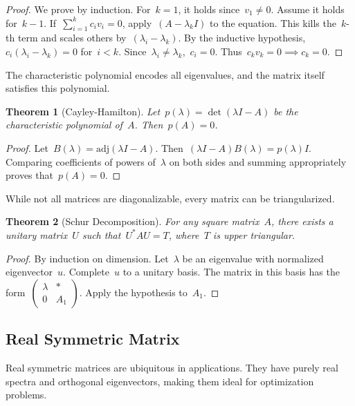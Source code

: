 \documentclass[12pt]{article}
\newtheorem{theorem}{Theorem}[section]
\begin{document}
\begin{proof}
    We prove by induction. For~$k=1$, it holds since~$v_1 \neq 0$. Assume it holds for~$k-1$. If~$\sum_{i=1}^k c_i v_i = 0$, apply~$(A - \lambda_k I)$ to the equation. This kills the~$k$-th term and scales others by~$(\lambda_i - \lambda_k)$. By the inductive hypothesis,~$c_i(\lambda_i - \lambda_k) = 0$ for~$i < k$. Since~$\lambda_i \neq \lambda_k$,~$c_i = 0$. Thus~$c_k v_k = 0 \implies c_k = 0$.
\end{proof}

The characteristic polynomial encodes all eigenvalues, and the matrix itself satisfies this polynomial.

\begin{theorem}[Cayley-Hamilton]
    Let~$p(\lambda) = \det(\lambda I - A)$ be the characteristic polynomial of~$A$. Then~$p(A) = 0$.
\end{theorem}

\begin{proof}
    Let~$B(\lambda) = \text{adj}(\lambda I - A)$. Then~$(\lambda I - A)B(\lambda) = p(\lambda)I$. Comparing coefficients of powers of~$\lambda$ on both sides and summing appropriately proves that~$p(A) = 0$.
\end{proof}

While not all matrices are diagonalizable, every matrix can be triangularized.

\begin{theorem}[Schur Decomposition]
    For any square matrix~$A$, there exists a unitary matrix~$U$ such that~$U^* A U = T$, where~$T$ is upper triangular.
\end{theorem}

\begin{proof}
    By induction on dimension. Let~$\lambda$ be an eigenvalue with normalized eigenvector~$u$. Complete~$u$ to a unitary basis. The matrix in this basis has the form~$\begin{pmatrix} \lambda & * \\ 0 & A_1 \end{pmatrix}$. Apply the hypothesis to~$A_1$.
\end{proof}

\subsection{Real Symmetric Matrix}

Real symmetric matrices are ubiquitous in applications. They have purely real spectra and orthogonal eigenvectors, making them ideal for optimization problems.
\end{document}
